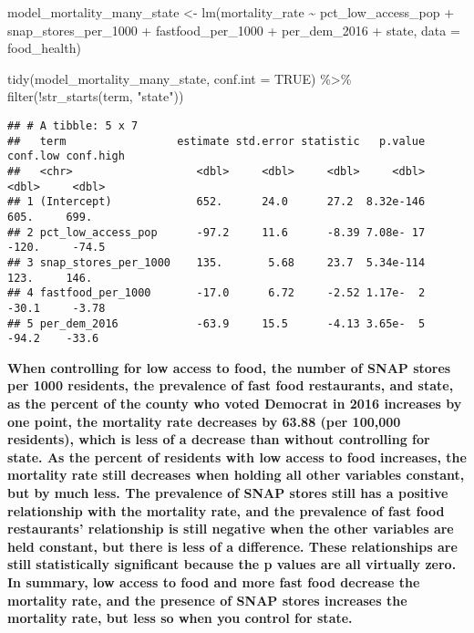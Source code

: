 \documentclass[
]{article}
\newenvironment{Shaded}{\begin{snugshade}}{\end{snugshade}}
\newcommand{\AttributeTok}[1]{\textcolor[rgb]{0.77,0.63,0.00}{#1}}
\newcommand{\ConstantTok}[1]{\textcolor[rgb]{0.00,0.00,0.00}{#1}}
\newcommand{\FunctionTok}[1]{\textcolor[rgb]{0.00,0.00,0.00}{#1}}
\newcommand{\NormalTok}[1]{#1}
\newcommand{\OtherTok}[1]{\textcolor[rgb]{0.56,0.35,0.01}{#1}}
\newcommand{\SpecialCharTok}[1]{\textcolor[rgb]{0.00,0.00,0.00}{#1}}
\newcommand{\StringTok}[1]{\textcolor[rgb]{0.31,0.60,0.02}{#1}}
\begin{document}
\begin{Shaded}
\begin{Highlighting}[]
\NormalTok{model\_mortality\_many\_state }\OtherTok{\textless{}{-}} \FunctionTok{lm}\NormalTok{(mortality\_rate }\SpecialCharTok{\textasciitilde{}}\NormalTok{ pct\_low\_access\_pop }\SpecialCharTok{+}
\NormalTok{                                            snap\_stores\_per\_1000 }\SpecialCharTok{+}
\NormalTok{                                            fastfood\_per\_1000 }\SpecialCharTok{+}
\NormalTok{                                            per\_dem\_2016 }\SpecialCharTok{+}
\NormalTok{                                            state,}
                           \AttributeTok{data =}\NormalTok{ food\_health)}

\FunctionTok{tidy}\NormalTok{(model\_mortality\_many\_state, }\AttributeTok{conf.int =} \ConstantTok{TRUE}\NormalTok{) }\SpecialCharTok{\%\textgreater{}\%} 
  \FunctionTok{filter}\NormalTok{(}\SpecialCharTok{!}\FunctionTok{str\_starts}\NormalTok{(term, }\StringTok{"state"}\NormalTok{))}
\end{Highlighting}
\end{Shaded}

\begin{verbatim}
## # A tibble: 5 x 7
##   term                 estimate std.error statistic   p.value conf.low conf.high
##   <chr>                   <dbl>     <dbl>     <dbl>     <dbl>    <dbl>     <dbl>
## 1 (Intercept)             652.      24.0      27.2  8.32e-146    605.     699.  
## 2 pct_low_access_pop      -97.2     11.6      -8.39 7.08e- 17   -120.     -74.5 
## 3 snap_stores_per_1000    135.       5.68     23.7  5.34e-114    123.     146.  
## 4 fastfood_per_1000       -17.0      6.72     -2.52 1.17e-  2    -30.1     -3.78
## 5 per_dem_2016            -63.9     15.5      -4.13 3.65e-  5    -94.2    -33.6
\end{verbatim}

\textbf{When controlling for low access to food, the number of SNAP
stores per 1000 residents, the prevalence of fast food restaurants, and
state, as the percent of the county who voted Democrat in 2016 increases
by one point, the mortality rate decreases by 63.88 (per 100,000
residents), which is less of a decrease than without controlling for
state. As the percent of residents with low access to food increases,
the mortality rate still decreases when holding all other variables
constant, but by much less. The prevalence of SNAP stores still has a
positive relationship with the mortality rate, and the prevalence of
fast food restaurants' relationship is still negative when the other
variables are held constant, but there is less of a difference. These
relationships are still statistically significant because the p values
are all virtually zero. In summary, low access to food and more fast
food decrease the mortality rate, and the presence of SNAP stores
increases the mortality rate, but less so when you control for state.}
\end{document}
